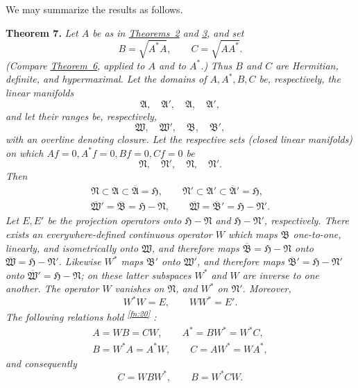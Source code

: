 \documentclass[fontsize=13pt,paper=b5,leqno,bookmarkpackage=false]{scrartcl}
\newcommand{\fnmarkref}[1]{%
  \textsuperscript{\hyperref[fn:#1]{\ref*{fn:#1}}}%
}
\begin{document}
We may summarize the results as follows.

\par\smallskip
{}
\label{thm:7}
\noindent\textbf{Theorem 7.}
\textit{Let \(A\) be as in \hyperref[thm:2]{Theorems~2} and
\hyperref[thm:3]{3}, and set}
\[
  B=\sqrt{A^*A},
  \qquad
  C=\sqrt{AA^*}.
\]
\textit{(Compare \hyperref[thm:6]{Theorem~6}, applied to \(A\) and to
\(A^*\).)}
\textit{Thus \(B\) and \(C\) are Hermitian, definite, and hypermaximal.
Let the domains of \(A,A^*,B,C\) be, respectively, the linear manifolds}
\[
  \mathfrak A,\quad \mathfrak A',\quad
  \mathfrak A,\quad \mathfrak A',
\]
\textit{and let their ranges be, respectively,}
\[
  \mathfrak W,\quad \mathfrak W',\quad
  \mathfrak B,\quad \mathfrak B',
\]
\textit{with an overline denoting closure.  Let the respective sets
(closed linear manifolds) on which \(Af=0,A^*f=0,Bf=0,Cf=0\) be}
\[
  \mathfrak N,\quad \mathfrak N',\quad
  \mathfrak N,\quad \mathfrak N'.
\]
\textit{Then}
\[
\begin{gathered}
  \mathfrak N\subset\mathfrak A\subset
  \overline{\mathfrak A}=\mathfrak H,
  \qquad
  \mathfrak N'\subset\mathfrak A'\subset
  \overline{\mathfrak A}'=\mathfrak H,\\
  \overline{\mathfrak W}'=\overline{\mathfrak B}
    =\mathfrak H-\mathfrak N,
  \qquad
  \overline{\mathfrak W}=\overline{\mathfrak B}'
    =\mathfrak H-\mathfrak N'.
\end{gathered}
\]
\textit{Let \(E,E'\) be the projection operators onto
\(\mathfrak H-\mathfrak N\) and
\(\mathfrak H-\mathfrak N'\), respectively.  There exists an
everywhere-defined continuous operator \(W\) which maps
\(\mathfrak B\) one-to-one, linearly, and isometrically onto
\(\mathfrak W\), and therefore maps
\(\overline{\mathfrak B}=\mathfrak H-\mathfrak N\) onto
\(\overline{\mathfrak W}=\mathfrak H-\mathfrak N'\).
Likewise \(W^*\) maps \(\mathfrak B'\) onto \(\mathfrak W'\), and
therefore maps
\(\overline{\mathfrak B}'=\mathfrak H-\mathfrak N'\) onto
\(\overline{\mathfrak W}'=\mathfrak H-\mathfrak N\); on these latter
subspaces \(W^*\) and \(W\) are inverse to one another.  The operator
\(W\) vanishes on \(\mathfrak N\), and \(W^*\) on
\(\mathfrak N'\).  Moreover,}
\[
  W^*W=E,
  \qquad
  WW^*=E'.
\]
\textit{The following relations hold\fnmarkref{20}:}
\label{eq:theorem7-relations}
\[
\begin{gathered}
  A=WB=CW,
  \qquad
  A^*=BW^*=W^*C,\\
  B=W^*A=A^*W,
  \qquad
  C=AW^*=WA^*,
\end{gathered}
\]
\textit{and consequently}
\[
  C=WBW^*,
  \qquad
  B=W^*CW.
\]
\end{document}
